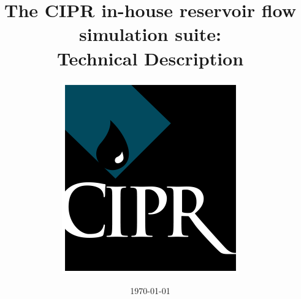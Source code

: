 \documentclass[a4paper,twoside,openright]{report}
\begin{document}
\dominitoc

\title{The CIPR in-house reservoir flow simulation suite:\\
Technical Description}
\author{\includegraphics[scale=2]{../figures/cipr-logo}}
\date{\today}

\maketitle

\tableofcontents













\end{document}

